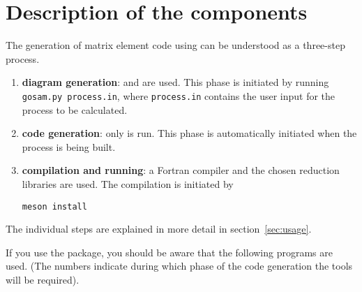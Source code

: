 \section{Description of the components}


The generation of matrix element code using \gosamv can be understood
as a three-step process.
\begin{enumerate}
\item  \textbf{diagram generation}: \python
and \qgraf are used. This phase is initiated by
running \texttt{gosam.py process.in}, where \texttt{process.in} contains the
user input for the process to be calculated.
\item \textbf{code generation}: only \form is run.
This phase is automatically initiated when the process is being built.
\item \textbf{compilation and running}:
a Fortran compiler and the chosen reduction libraries are used.
The compilation is initiated by
\begin{lstlisting}[style=sh]
meson install
\end{lstlisting}
\end{enumerate}
The individual steps are explained in more detail in section~\ref{sec:usage}.

If you use the \gosamv package, you should be aware that
the following programs are used.
(The numbers indicate during which phase of the code generation
the tools will be required).

